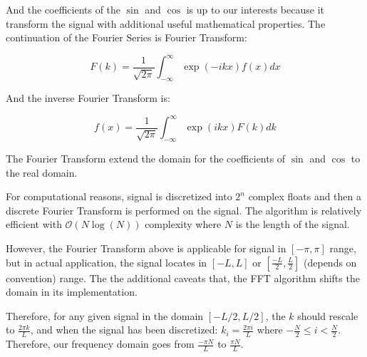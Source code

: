 \documentclass{article}
\begin{document}
    \par
    And the coefficients of the $\sin$ and $\cos$ is up to our interests because it transform the signal with additional useful mathematical properties. 
    The continuation of the Fourier Series is Fourier Transform: 
    
    \begin{equation}\label{eqn:fourier-transform}
        F(k) = \frac{1}{\sqrt{2\pi}}\int_{-\infty}^\infty
        \exp(-ikx)f(x) dx
    \end{equation}
    
    And the inverse Fourier Transform is: 
    
    \begin{equation}
        f(x) = \frac{1}{\sqrt{2\pi}}
        \int_{-\infty}^\infty \exp(ikx) F(k)dk
    \end{equation}
    \par
    The Fourier Transform extend the domain for the coefficients of $\sin$ and $\cos$ to the real domain. 
    
    \par
    For computational reasons, signal is discretized into $2^n$ complex floats and then a discrete Fourier Transform is performed on the signal. The algorithm is relatively efficient with $\mathcal{O}(N\log(N))$ complexity where $N$ is the length of the signal. 
    
    \par
    However, the Fourier Transform above is applicable for signal in $[-\pi, \pi]$ range, but in actual application, the signal locates in $[-L, L]$ or $[\frac{-L}{2}, \frac{L}{2}]$ (depends on convention) range. The the additional caveats that, the FFT algorithm shifts the domain in its implementation. 
    
    \par
    Therefore, for any given signal in the domain $[-L/2, L/2]$, the $k$ should rescale to $\frac{2\pi k}{L}$, and when the signal has been discretized: $k_i = \frac{2\pi i}{L}$ where $-\frac{N}{2}\le i< \frac{N}{2}$. Therefore, our frequency domain goes from $\frac{-\pi N}{L}$ to $\frac{\pi N}{L}$. 
\end{document}
